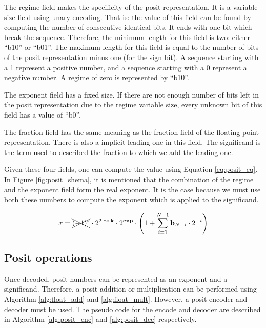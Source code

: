 The regime field makes the specificity of the posit representation. It is a variable size field using unary encoding. That is: the value of this field can be found by computing the number of consecutive identical bits. It ends with one bit which break the sequence. Therefore, the minimum length for this field is two: either ``b10'' or ``b01''. The maximum length for this field is equal to the number of bits of the posit representation minus one (for the sign bit). A sequence starting with a 1 represent a positive number, and a sequence starting with a 0 represent a negative number. A regime of zero is represented by ``b10''.

The exponent field has a fixed size. If there are not enough number of bits left in the posit representation due to the regime variable size, every unknown bit of this field has a value of ``b0''.

The fraction field has the same meaning as the fraction field of the floating point representation. There is also a implicit leading one in this field. The significand is the term used to described the fraction to which we add the leading one.

Given these four fields, one can compute the value using Equation \ref{eq:posit_eq}. In Figure \ref{fig:posit_shema}, it is mentioned that the combination of the regime and the exponent field form the real exponent. It is the case because we must use both these numbers to compute the exponent which is applied to the significand.


\begin{equation}
x = \xcancel{(-1)^s} \cdot 2^{2\cdot es \cdot \text{\textbf{k}}} \cdot 2^\text{\textbf{exp}} \cdot \left( 1 + \sum_{i=1}^{N-1}  \text{\textbf{b}}_{N-i} \cdot 2^{-i} \right)
\label{eq:posit_eq}
\end{equation}

\subsection{Posit operations}
Once decoded, posit numbers can be represented as an exponent and a significand. Therefore, a posit addition or multiplication can be performed using Algorithm \ref{alg:float_add} and \ref{alg:float_mult}. However, a posit encoder and decoder must be used. The pseudo code for the encode and decoder are described in Algorithm \ref{alg:posit_enc} and \ref{alg:posit_dec} respectively.

